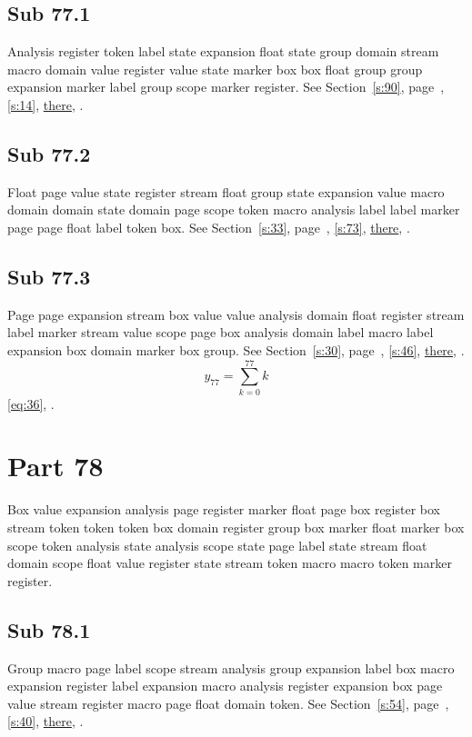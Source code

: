 \documentclass[11pt]{article}
\begin{document}
\subsection{Sub 77.1}\label{ss:77.1} Analysis register token label state expansion float state group domain stream macro domain value register value state marker box box float group group expansion marker label group scope marker register. See Section~\ref{s:90}, page~\pageref{ss:95.3}, \cref{s:14}, \hyperref[s:99]{there}, \cite{k70,k94}.
\subsection{Sub 77.2}\label{ss:77.2} Float page value state register stream float group state expansion value macro domain domain state domain page scope token macro analysis label label marker page page float label token box. See Section~\ref{s:33}, page~\pageref{ss:93.2}, \cref{s:73}, \hyperref[s:33]{there}, \cite{k110,k45}.
\subsection{Sub 77.3}\label{ss:77.3} Page page expansion stream box value value analysis domain float register stream label marker stream value scope page box analysis domain label macro label expansion box domain marker box group. See Section~\ref{s:30}, page~\pageref{ss:2.3}, \cref{s:46}, \hyperref[s:75]{there}, \cite{k38,k20}.
\begin{equation}y_{77}=\sum_{k=0}^{77}k\label{eq:77}\end{equation} \eqref{eq:36}, .
\section{Part 78}\label{s:78}
Box value expansion analysis page register marker float page box register box stream token token token box domain register group box marker float marker box scope token analysis state analysis scope state page label state stream float domain scope float value register state stream token macro macro token marker register.
\subsection{Sub 78.1}\label{ss:78.1} Group macro page label scope stream analysis group expansion label box macro expansion register label expansion macro analysis register expansion box page value stream register macro page float domain token. See Section~\ref{s:54}, page~\pageref{ss:59.2}, \cref{s:40}, \hyperref[s:5]{there}, \cite{k23,k103}.
\end{document}
